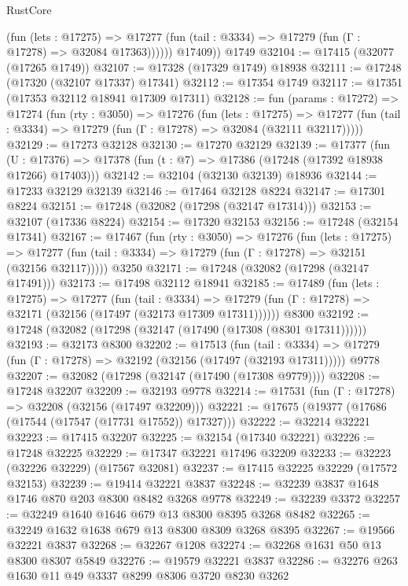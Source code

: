\begin{lexlean}{RustCore}
\begin{coremodule}
              (fun (lets : @17275) =>
              @17277 (fun (tail : @3334) => @17279 (fun (Γ : @17278) => @32084 @17363))))))
        @17409))
    @1749
@32104 := @17415 (@32077 (@17265 @1749))
@32107 := @17328 (@17329 @1749) @18938
@32111 := @17248 (@17320 (@32107 @17337) @17341)
@32112 := @17354 @1749
@32117 := @17351 (@17353 @32112 @18941 @17309 @17311)
@32128 := fun (params : @17272) =>
  @17274
    (fun (rty : @3050) =>
    @17276
      (fun (lets : @17275) =>
      @17277 (fun (tail : @3334) => @17279 (fun (Γ : @17278) => @32084 (@32111 @32117)))))
@32129 := @17273 @32128
@32130 := @17270 @32129
@32139 := @17377
    (fun (U : @17376) => @17378 (fun (t : @7) => @17386 (@17248 (@17392 @18938 @17266) @17403)))
@32142 := @32104 (@32130 @32139) @18936
@32144 := @17233 @32129 @32139
@32146 := @17464 @32128 @8224
@32147 := @17301 @8224
@32151 := @17248 (@32082 (@17298 (@32147 @17314)))
@32153 := @32107 (@17336 @8224)
@32154 := @17320 @32153
@32156 := @17248 (@32154 @17341)
@32167 := @17467
    (fun (rty : @3050) =>
    @17276
      (fun (lets : @17275) =>
      @17277 (fun (tail : @3334) => @17279 (fun (Γ : @17278) => @32151 (@32156 @32117)))))
    @3250
@32171 := @17248 (@32082 (@17298 (@32147 @17491)))
@32173 := @17498 @32112 @18941
@32185 := @17489
    (fun (lets : @17275) =>
    @17277
      (fun (tail : @3334) =>
      @17279 (fun (Γ : @17278) => @32171 (@32156 (@17497 (@32173 @17309 @17311))))))
    @8300
@32192 := @17248 (@32082 (@17298 (@32147 (@17490 (@17308 (@8301 @17311))))))
@32193 := @32173 @8300
@32202 := @17513
    (fun (tail : @3334) => @17279 (fun (Γ : @17278) => @32192 (@32156 (@17497 (@32193 @17311)))))
    @9778
@32207 := @32082 (@17298 (@32147 (@17490 (@17308 @9779))))
@32208 := @17248 @32207
@32209 := @32193 @9778
@32214 := @17531 (fun (Γ : @17278) => @32208 (@32156 (@17497 @32209)))
@32221 := @17675 (@19377 (@17686 (@17544 (@17547 (@17731 @17552)) @17327)))
@32222 := @32214 @32221
@32223 := @17415 @32207
@32225 := @32154 (@17340 @32221)
@32226 := @17248 @32225
@32229 := @17347 @32221 @17496 @32209
@32233 := @32223 (@32226 @32229) (@17567 @32081)
@32237 := @17415 @32225 @32229 (@17572 @32153)
@32239 := @19414 @32221 @3837
@32248 := @32239 @3837 @1648 @1746 @870 @203 @8300 @8482 @3268 @9778
@32249 := @32239 @3372
@32257 := @32249 @1640 @1646 @679 @13 @8300 @8395 @3268 @8482
@32265 := @32249 @1632 @1638 @679 @13 @8300 @8309 @3268 @8395
@32267 := @19566 @32221 @3837
@32268 := @32267 @1208
@32274 := @32268 @1631 @50 @13 @8300 @8307 @5849
@32276 := @19579 @32221 @3837
@32286 := @32276 @263 @1630 @11 @49 @3337 @8299 @8306 @3720 @8230 @3262

\end{coremodule}
\end{lexlean}

